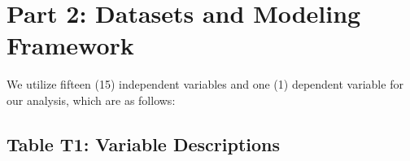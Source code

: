 \documentclass[
]{article}
\begin{document}
\hypertarget{part-2-datasets-and-modeling-framework-1}{%
\section{Part 2: Datasets and Modeling
Framework}\label{part-2-datasets-and-modeling-framework-1}}

We utilize fifteen (15) independent variables and one (1) dependent
variable for our analysis, which are as follows:

\hypertarget{table-t1-variable-descriptions}{%
\subsection{Table T1: Variable
Descriptions}\label{table-t1-variable-descriptions}}

\begin{table}[!h]


\end{table}
\end{document}
